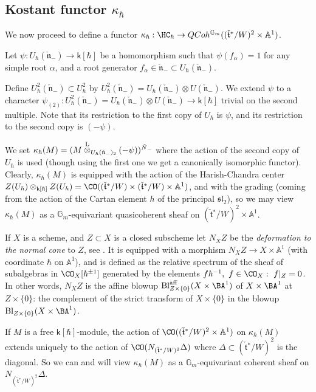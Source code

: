\documentclass[11pt]{amsart}
\theoremstyle{definition}
\theoremstyle{remark}
\theoremstyle{remark}
\newcommand{\<}{\langle}
\renewcommand{\>}{\rangle}
\newcommand{\Ln}{\check{\mathfrak n}{}}
\newcommand{\Lt}{\check{\mathfrak t}{}}
\newcommand{\LN}{\check{N}{}}
\newcommand{\Lotimes}{\overset{\rm L}{\otimes}}
\newcommand{\Aone}{{\mathbb A}^1}
\newcommand{\Gm}{{{\mathbb G}_m}}
\newcommand{\HCh}{\HC_\hbar}
\newcommand{\kappah}{{\kappa_\hbar}}
\newcommand{\kappahbar}{{{\overline\kappa_\hbar}}}
\newcommand{\kk}{\mathsf k}
\begin{document}
\subsection{Kostant functor $\kappah$} 
\label{Kostant}
We now proceed to
define a functor $\kappah:\HCh\to QCoh^\Gm((\Lt^*/W)^2\times \Aone)$.

Let $\psi:U_\hbar (\Ln_-)\to\kk[\hbar]$ be a homomorphism
such that $\psi(f_\alpha)=1$ for any simple root 
$\alpha$, and a root generator $f_\alpha\in\Ln_-\subset U_\hbar(\Ln_-)$.

Define  $U_\hbar^2(\Ln_-)\subset U_\hbar ^2$ by 
$U_\hbar^2(\Ln_-)=U_\hbar(\Ln_-)
\otimes U(\Ln_-)$. We extend $\psi$ to a  
character $\psi_{(2)}: U_\hbar^2(\Ln_-)
=U_\hbar(\Ln_-) \otimes U(\Ln_-)
\to\kk[\hbar]$ trivial on the second multiple. Note that its restriction
to the first copy of $U_\hbar$ is $\psi$, and its restriction
to the second copy is $(-\psi)$. 


We set $\kappah(M)=(M\Lotimes_{U_\hbar(\Ln_-)_2}(-\psi))^{\LN_-}$
where the action of the second copy of $U_\hbar$ is used (though using 
the first one we get a canonically isomorphic functor). Clearly,
$\kappah(M)$ is equipped with the action of the Harish-Chandra center
$Z(U_\hbar)\otimes_{\kk[\hbar]}Z(U_\hbar)=
\CO((\Lt^*/W)\times(\Lt^*/W)\times\Aone)$, 
and with the grading (coming from the action of the Cartan element $h$
of the principal $\mathfrak{sl}_2$), so we may
view $\kappah(M)$ as a $\Gm$-equivariant quasicoherent sheaf on 
$(\Lt^*/W)^2\times\Aone$.

If $X$ is a scheme, and $Z\subset X$ is a closed subscheme let
$N_XZ$ be the {\it deformation to the normal cone} to $Z$, see
\cite{Fu}. It is equipped with a morphism $N_XZ\to X\times\Aone$
(with coordinate $\hbar$ on $\Aone$),
and is defined as the relative spectrum of the sheaf of subalgebras in
$\CO_X[\hbar^{\pm1}]$ generated by the elements $f\hbar^{-1},\ 
f\in\CO_X:\ f|_Z=0$. In other words, $N_XZ$ is the affine blowup
$\operatorname{Bl}_{Z\times\{0\}}^{\operatorname{aff}}(X\times\BA^1)$ of $X\times\BA^1$ at $Z\times\{0\}$:
the complement of the strict transform of $X\times\{0\}$ in the blowup $\operatorname{Bl}_{Z\times\{0\}}(X\times\BA^1)$.

If $M$ is a free $\kk[\hbar]$-module, 
the action of $\CO((\Lt^*/W)^2\times\Aone)$
on $\kappah(M)$ extends uniquely to the action of
$\CO(N_{(\Lt^*/W)^2}\Delta)$ where $\Delta\subset(\Lt^*/W)^2$ is the 
diagonal. So we can and will view $\kappah(M)$ as a $\Gm$-equivariant
coherent sheaf on $N_{(\Lt^*/W)^2}\Delta$.
\end{document}
